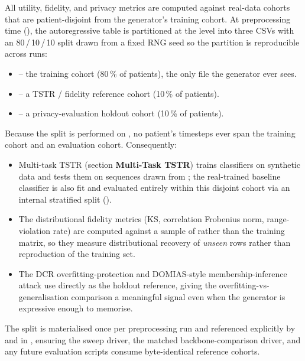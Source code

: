 All utility, fidelity, and privacy metrics are computed against real-data cohorts that are patient-disjoint from the generator's training cohort.
At preprocessing time (), the autoregressive table is partitioned at the  level into three CSVs with an 80\,/\,10\,/\,10 split drawn from a fixed RNG seed so the partition is reproducible across runs:
\begin{itemize}\tightlist
    \item {} -- the training cohort (80\,\% of patients), the only file the generator ever sees.
    \item {} -- a TSTR / fidelity reference cohort (10\,\% of patients).
    \item {} -- a privacy-evaluation holdout cohort (10\,\% of patients).
\end{itemize}

Because the split is performed on , no patient's timesteps ever span the training cohort and an evaluation cohort.
Consequently:
\begin{itemize}\tightlist
    \item Multi-task TSTR (section \textbf{Multi-Task TSTR}) trains classifiers on synthetic data and tests them on sequences drawn from ; the real-trained baseline classifier is also fit and evaluated entirely within this disjoint cohort via an internal stratified split ().
    \item The distributional fidelity metrics (KS, correlation Frobenius norm, range-violation rate) are computed against a sample of  rather than the training matrix, so they measure distributional recovery of \emph{unseen} rows rather than reproduction of the training set.
    \item The DCR overfitting-protection and DOMIAS-style membership-inference attack use  directly as the holdout reference, giving the overfitting-vs-generalisation comparison a meaningful signal even when the generator is expressive enough to memorise.
\end{itemize}

The split is materialised once per preprocessing run and referenced explicitly by  and  in , ensuring the sweep driver, the matched backbone-comparison driver, and any future evaluation scripts consume byte-identical reference cohorts.

